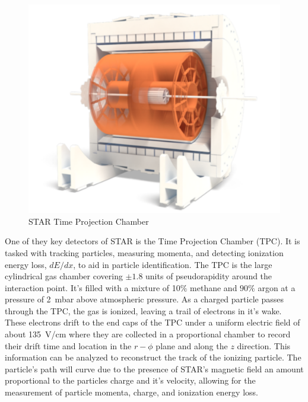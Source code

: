 \documentclass[letterpaper, abstract = on,listof=totoc, bibliography=totoc]{scrreprt}
\begin{document}
\begin{figure}[h!]
\begin{center}
\includegraphics[width = .7\textwidth]{TPCfull}
\caption[STAR Time Projection Chamber]{STAR Time Projection Chamber}
\label{fig:tpcSchem}
\end{center}
\end{figure}

%
%


One of they key detectors of STAR is the Time Projection Chamber (TPC). It is tasked with tracking particles, measuring momenta, and detecting ionization energy loss, $dE/dx$, to aid in particle identification. The TPC is the large cylindrical gas chamber covering $\pm1.8$ units of pseudorapidity around the interaction point. It's filled with a mixture of 10$\%$ methane and $90\%$ argon at a pressure of 2~mbar above atmospheric pressure. As a charged particle passes through the TPC, the gas is ionized, leaving a trail of electrons in it's wake. These electrons drift to the end caps of the TPC under a uniform electric field of about 135~V/cm where they are collected in a proportional chamber to record their drift time and location in the $r-\phi$ plane and along the $z$ direction. This information can be analyzed to reconstruct the track of the ionizing particle. The particle's path will curve due to the presence of STAR's magnetic field an amount proportional to the particles charge and it's velocity, allowing for the measurement of particle momenta, charge, and ionization energy loss.



\end{document}
